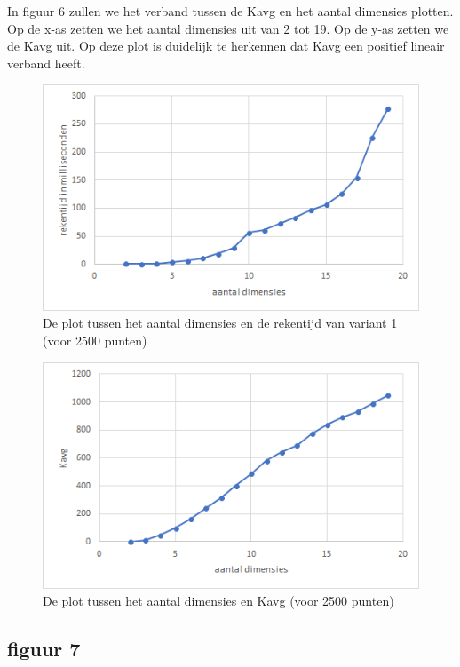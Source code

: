 \documentclass[12pt]{article}
\begin{document}
In figuur 6 zullen we het verband tussen de Kavg en het aantal dimensies plotten.
Op de x-as zetten we het aantal dimensies uit van 2 tot 19.
Op de y-as zetten we de Kavg uit.
Op deze plot is duidelijk te herkennen dat Kavg een positief lineair verband heeft.

\begin{figure}
\includegraphics[width=\textwidth]{dim-var1-rekentijd.png}
\caption{De plot tussen het aantal dimensies en de rekentijd van variant 1 (voor 2500 punten)}
\end{figure}

\begin{figure}
\includegraphics[width=\textwidth]{dim-Kavg.png}
\caption{De plot tussen het aantal dimensies en Kavg (voor 2500 punten)}
\end{figure}

\subsection{figuur 7}
\end{document}
